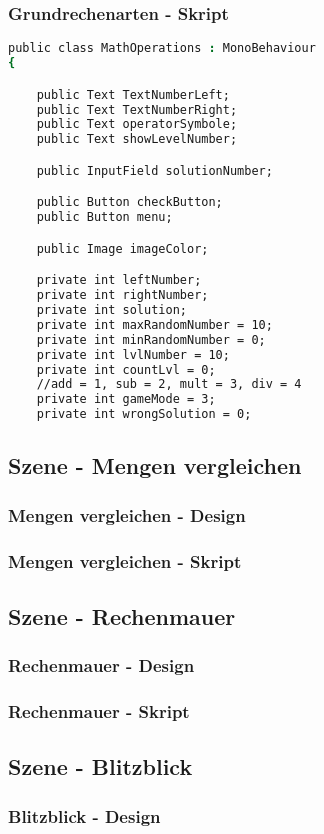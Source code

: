 \subsubsection{Grundrechenarten - Skript}
\begin{lstlisting}[language=csh, caption={MathOperations.cs SpawnButtonsRight Funktion}]
public class MathOperations : MonoBehaviour
{

	public Text TextNumberLeft;
	public Text TextNumberRight;
	public Text operatorSymbole;
	public Text showLevelNumber;

	public InputField solutionNumber;

	public Button checkButton;
	public Button menu;

	public Image imageColor;

	private int leftNumber;
	private int rightNumber;
	private int solution;
	private int maxRandomNumber = 10;
	private int minRandomNumber = 0;
	private int lvlNumber = 10;
	private int countLvl = 0;
	//add = 1, sub = 2, mult = 3, div = 4
	private int gameMode = 3;
	private int wrongSolution = 0;
\end{lstlisting}
\subsection{Szene - Mengen vergleichen}
\subsubsection{Mengen vergleichen - Design}
\subsubsection{Mengen vergleichen - Skript}
\subsection{Szene - Rechenmauer}
\subsubsection{Rechenmauer - Design}
\subsubsection{Rechenmauer - Skript}
\subsection{Szene - Blitzblick}
\subsubsection{Blitzblick - Design}
